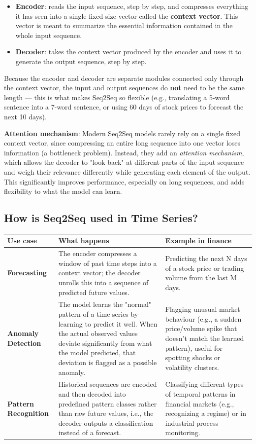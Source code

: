 \documentclass[12pt,openany]{book}
\theoremstyle{definition}
\theoremstyle{remark}
\begin{document}
\begin{itemize}
\item \textbf{Encoder}: reads the input sequence, step by step, and compresses everything it has seen into a single fixed-size vector called the \textbf{context vector}. This vector is meant to summarize the essential information contained in the whole input sequence.
\item \textbf{Decoder}: takes the context vector produced by the encoder and uses it to generate the output sequence, step by step.

\end{itemize}
Because the encoder and decoder are separate modules connected only through the context vector, the input and output sequences do \textbf{not} need to be the same length --- this is what makes Seq2Seq so flexible (e.g., translating a 5-word sentence into a 7-word sentence, or using 60 days of stock prices to forecast the next 10 days).

\textbf{Attention mechanism}: Modern Seq2Seq models rarely rely on a single fixed context vector, since compressing an entire long sequence into one vector loses information (a bottleneck problem). Instead, they add an \emph{attention mechanism}, which allows the decoder to "look back" at different parts of the input sequence and weigh their relevance differently while generating each element of the output. This significantly improves performance, especially on long sequences, and adds flexibility to what the model can learn.

\subsection{How is Seq2Seq used in Time Series?}

{\small
\begin{longtable}{@{}L{0.20\textwidth}L{0.34\textwidth}L{0.38\textwidth}@{}}
\toprule
Use case & What happens & Example in finance \\
\midrule
\textbf{Forecasting} & The encoder compresses a window of past time steps into a context vector; the decoder unrolls this into a sequence of predicted future values. & Predicting the next N days of a stock price or trading volume from the last M days. \\
\textbf{Anomaly Detection} & The model learns the "normal" pattern of a time series by learning to predict it well. When the actual observed values deviate significantly from what the model predicted, that deviation is flagged as a possible anomaly. & Flagging unusual market behaviour (e.g., a sudden price/volume spike that doesn't match the learned pattern), useful for spotting shocks or volatility clusters. \\
\textbf{Pattern Recognition} & Historical sequences are encoded and then decoded into predefined pattern classes rather than raw future values, i.e., the decoder outputs a classification instead of a forecast. & Classifying different types of temporal patterns in financial markets (e.g., recognizing a regime) or in industrial process monitoring. \\
\bottomrule
\end{longtable}
}
\end{document}
